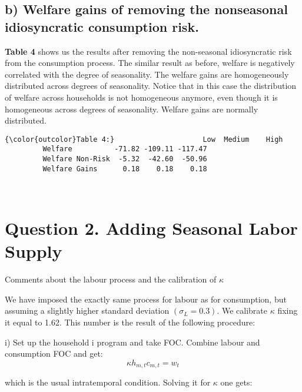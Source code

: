 \documentclass[11pt]{article}
\begin{document}
\subsection*{b) Welfare gains of removing the nonseasonal idiosyncratic consumption risk.}


\textbf{Table 4} shows us the results after removing the non-seasonal idiosyncratic risk from the consumption process.
The similar result as before, welfare is negatively correlated with the degree of seasonality. The welfare gains are homogeneously distributed across degrees of seasonality.
Notice that in this case the distribution of welfare across households is not homogeneous anymore, even though it is homogeneous across degrees of seasonality.
Welfare gains are normally distributed.

\begin{Verbatim}[commandchars=\\\{\}]
{\color{outcolor}Table 4:}                     Low  Medium    High
         Welfare          -71.82 -109.11 -117.47
         Welfare Non-Risk  -5.32  -42.60  -50.96
         Welfare Gains      0.18    0.18    0.18
\end{Verbatim}
            
   
    \begin{center}
    \end{center}
    { \hspace*{\fill} \\}
    
\section*{Question 2. Adding Seasonal Labor Supply}

Comments about the labour process and the calibration of $\kappa$

We have imposed the exactly same process for labour as for consumption, but assuming a slightly higher standard deviation $(\sigma_L=0.3).$
We calibrate $\kappa$ fixing it equal to 1.62. This number is the result of the following procedure:

i) Set up the household i program and take FOC. Combine labour and consumption FOC and get:\\

$$\kappa h_{m,t}c_{m,t} = w_t $$


which is the usual intratemporal condition. Solving it for $\kappa$ one gets:
\end{document}
